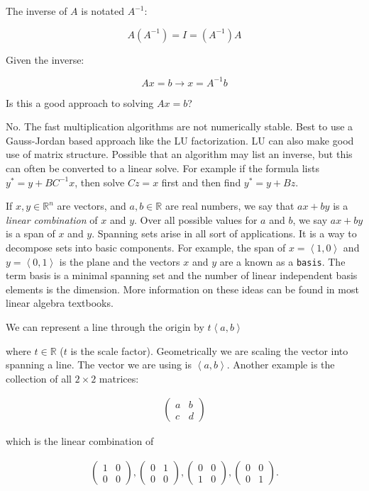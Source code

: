 The inverse of \(A\) is notated \(A^{-1}\):

\[A(A^{-1}) = I =
(A^{-1})A\]

Given the inverse:

\[Ax=b \to x = A^{-1}b\]

Is this a good approach to solving \(Ax=b\)?

No. The fast multiplication algorithms are not numerically stable. Best
to use a Gauss-Jordan based approach like the LU factorization. LU can
also make good use of matrix structure. Possible that an algorithm may
list an inverse, but this can often be converted to a linear solve. For
example if the formula lists \(y^* = y + BC^{-1}x\), then solve
\(Cz = x\) first and then find \(y^*=y+Bz\).

If \(x, y\in {\mathbb R}^n\) are vectors, and \(a, b\in {\mathbb R}\)
are real numbers, we say that \(ax+by\) is a \emph{linear combination}
of \(x\) and \(y\). Over all possible values for \(a\) and \(b\), we say
\(ax+by\) is a span of \(x\) and \(y\). Spanning sets arise in all sort
of applications. It is a way to decompose sets into basic components.
For example, the span of \(x = \left< 1, 0 \right>\) and
\(y = \left< 0, 1 \right>\) is the plane and the vectors \(x\) and \(y\)
are a known as a \texttt{basis}. The term basis is a minimal spanning
set and the number of linear independent basis elements is the
dimension. More information on these ideas can be found in most linear
algebra textbooks.

We can represent a line through the origin by
\(t \left< a  , b \right>\)

where \(t\in {\mathbb R}\) (\(t\) is the scale factor). Geometrically we
are scaling the vector into spanning a line. The vector we are using is
\(\left< a  , b \right>\). Another example is the collection of all
\(2\times 2\) matrices:

\[\begin{aligned}
\begin{pmatrix} a & b \\ c & d\end{pmatrix}
\end{aligned}\]

which is the linear combination of

\[\begin{aligned}
\begin{pmatrix} 1 & 0 \\ 0 & 0\end{pmatrix},
\begin{pmatrix} 0 & 1 \\ 0 & 0\end{pmatrix},
\begin{pmatrix} 0 & 0 \\ 1 & 0\end{pmatrix},
\begin{pmatrix} 0 & 0 \\ 0 & 1\end{pmatrix}.
\end{aligned}\]

